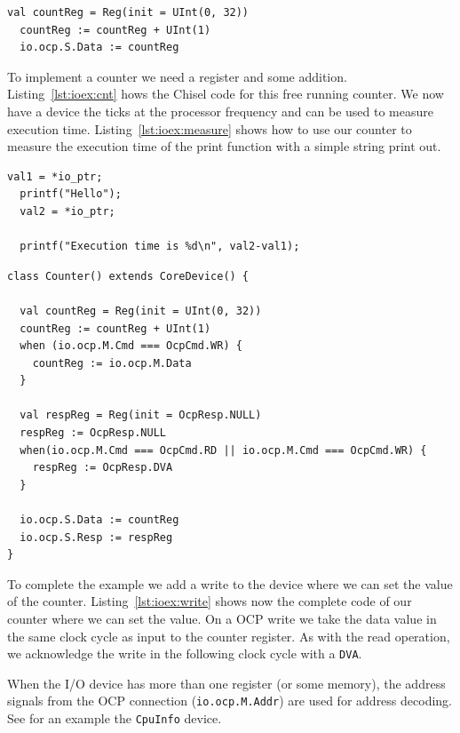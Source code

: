\documentclass[a4paper,fontsize=10pt,twoside,DIV15,BCOR12mm,headinclude=true,footinclude=false,pagesize,bibtotoc]{scrbook}
\newcommand{\code}[1]{{\texttt{#1}}}
\begin{document}
\begin{lstlisting}[float, caption={Chisel code for counting\label{lst:ioex:cnt}}]
  val countReg = Reg(init = UInt(0, 32))
  countReg := countReg + UInt(1)
  io.ocp.S.Data := countReg
\end{lstlisting}

To implement a counter we need a register and some addition.
Listing~\ref{lst:ioex:cnt} hows the Chisel code for this free running counter.
We now have a device the ticks at the processor frequency and can be used
to measure execution time. Listing~\ref{lst:ioex:measure} shows how to use
our counter to measure the execution time of the print function with a simple
string print out.

\begin{lstlisting}[float, caption={Measure execution time\label{lst:ioex:measure}}]
  val1 = *io_ptr;
  printf("Hello");
  val2 = *io_ptr;

  printf("Execution time is %d\n", val2-val1);
\end{lstlisting}

\begin{lstlisting}[float, caption={A writable counter\label{lst:ioex:write}}]
class Counter() extends CoreDevice() {

  val countReg = Reg(init = UInt(0, 32))
  countReg := countReg + UInt(1)
  when (io.ocp.M.Cmd === OcpCmd.WR) {
    countReg := io.ocp.M.Data 
  }
  
  val respReg = Reg(init = OcpResp.NULL)
  respReg := OcpResp.NULL
  when(io.ocp.M.Cmd === OcpCmd.RD || io.ocp.M.Cmd === OcpCmd.WR) {
    respReg := OcpResp.DVA
  }
  
  io.ocp.S.Data := countReg  
  io.ocp.S.Resp := respReg
}
\end{lstlisting}

To complete the example we add a write to the device where we can set
the value of the counter. Listing~\ref{lst:ioex:write} shows now the complete
code of our counter where we can set the value. On a OCP write we take the
data value in the same clock cycle as input to the counter register.
As with the read operation, we acknowledge the write in the following clock
cycle with a \code{DVA}.

When the I/O device has more than one register (or some memory), the
address signals from the OCP connection (\code{io.ocp.M.Addr}) are used
for address decoding. See for an example the \code{CpuInfo} device.




\end{document}
